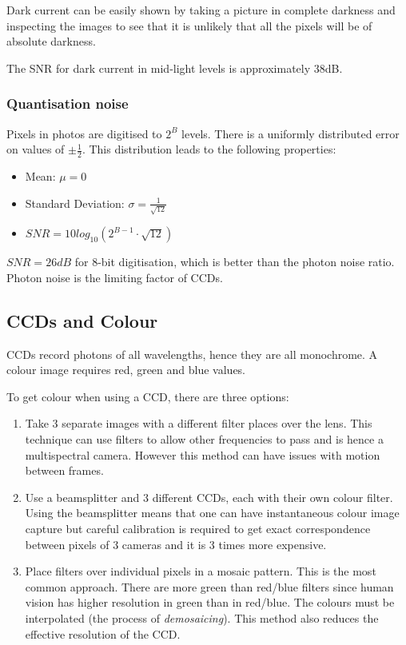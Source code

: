 \documentclass{article}\author{Hawley, Adam}
\begin{document}
Dark current can be easily shown by taking a picture in complete darkness and inspecting the images to see that it is unlikely that all the pixels will be of absolute darkness.

The SNR for dark current in mid-light levels is approximately 38dB.

\subsubsection{Quantisation noise}
Pixels in photos are digitised to $2^B$ levels. There is a uniformly distributed error on values of $\pm\frac{1}{2}$. This distribution leads to the following properties:
\begin{itemize}
	\item Mean: $\mu = 0$
	\item Standard Deviation: $\sigma =\frac{1}{\sqrt{12}}$ 
	\item $SNR = 10log_{10}(2^{B-1}\cdot \sqrt{12})$
\end{itemize}

$SNR = 26dB$ for 8-bit digitisation, which is better than  the photon noise ratio. Photon noise is the limiting factor of CCDs.
\subsection{CCDs and Colour}
CCDs record photons of all wavelengths, hence they are all monochrome.
A colour image requires red, green and blue values.

To get colour when using a CCD, there are three options:
\begin{enumerate}
	\item Take 3 separate images with a different filter places over the lens. This technique can use filters to allow other frequencies to pass and is hence a multispectral camera. However this method can have issues with motion between frames.
	\item Use a beamsplitter and 3 different CCDs, each with their own colour filter. Using the beamsplitter means that one can have instantaneous colour image capture but careful calibration is required to get exact correspondence between pixels of 3 cameras and it is 3 times more expensive.
	\item Place filters over individual pixels in a mosaic pattern. This is the most common approach. 
		There are more green than red/blue filters since human vision has higher resolution in green than in red/blue. 
		The colours must be interpolated (the process of {\it demosaicing}).
		This method also reduces the effective resolution of the CCD.
\end{enumerate}
\end{document}
